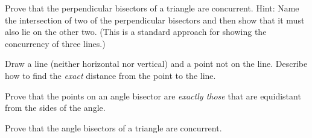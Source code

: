 \begin{prob}
Prove that the perpendicular bisectors of a triangle are concurrent.  Hint:  Name the intersection of two of the perpendicular bisectors and then show that it must also lie on the other two.  (This is a standard approach for showing the concurrency of three lines.)  
\end{prob}

\begin{prob}
Draw a line (neither horizontal nor vertical) and a point not on the line.  Describe how to find the \emph{exact} distance from the point to the line. 
\end{prob}

\begin{prob}
Prove that the points on an angle bisector are \emph{exactly those} that are equidistant from the sides of the angle. 
\end{prob}

\begin{prob}
Prove that the angle bisectors of a triangle are concurrent. 
\end{prob}

